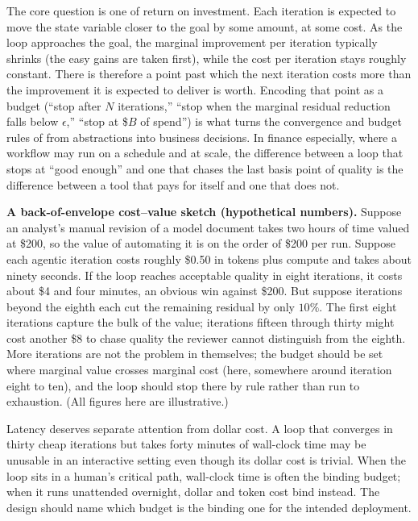 The core question is one of return on investment. Each iteration is expected to
move the state variable closer to the goal by some amount, at some cost. As the
loop approaches the goal, the marginal improvement per iteration typically
shrinks (the easy gains are taken first), while the cost per iteration stays
roughly constant. There is therefore a point past which the next iteration costs
more than the improvement it is expected to deliver is worth. Encoding that point
as a budget (``stop after $N$ iterations,'' ``stop when the marginal residual
reduction falls below $\epsilon$,'' ``stop at \$$B$ of spend'') is what turns the
convergence and budget rules of  from abstractions
into business decisions. In finance especially, where a workflow may run on a
schedule and at scale, the difference between a loop that stops at ``good enough''
and one that chases the last basis point of quality is the difference between a
tool that pays for itself and one that does not.

\begin{context}
\textbf{A back-of-envelope cost--value sketch (hypothetical numbers).}
Suppose an analyst's manual revision of a model document takes two hours of time
valued at \$200, so the value of automating it is on the order of \$200 per run.
Suppose each agentic iteration costs roughly \$0.50 in tokens plus compute and
takes about ninety seconds. If the loop reaches acceptable quality in eight
iterations, it costs about \$4 and four minutes, an obvious win against \$200.
But suppose iterations beyond the eighth each cut the remaining residual by only
$10\%$. The first eight iterations capture the bulk of the value; iterations
fifteen through thirty might cost another \$8 to chase quality the reviewer cannot
distinguish from the eighth. More iterations are not the problem in themselves; the
budget should be set where marginal value crosses marginal cost (here, somewhere
around iteration eight to ten), and the loop should stop there by rule rather than
run to exhaustion. (All figures here are illustrative.)
\end{context}

\begin{remark}
Latency deserves separate attention from dollar cost. A loop that converges in
thirty cheap iterations but takes forty minutes of wall-clock time may be
unusable in an interactive setting even though its dollar cost is trivial. When
the loop sits in a human's critical path, wall-clock time is often the binding
budget; when it runs unattended overnight, dollar and token cost bind instead.
The design should name which budget is the binding one for the intended
deployment.
\end{remark}

